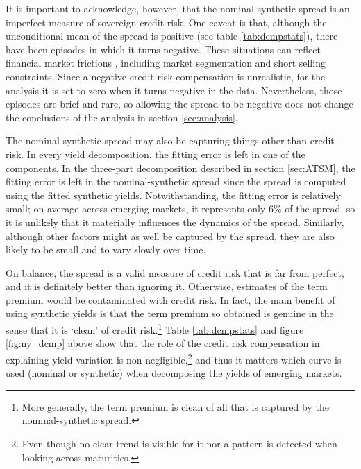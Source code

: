 {It is important to acknowledge, however, that the nominal-synthetic spread is an imperfect measure of sovereign credit risk. 
One caveat is that, although the unconditional mean of the spread is positive (see table \ref{tab:dcmpstats}), there have been episodes in which it turns negative. 
These situations can reflect financial market frictions \citep{DuSchreger:2016JoF}, including market segmentation and short selling constraints. 
Since a negative credit risk compensation is unrealistic, for the analysis it is set to zero when it turns negative in the data. 
Nevertheless, those episodes are brief and rare, so allowing the spread to be negative does not change the conclusions of the analysis in section \ref{sec:analysis}. 

The nominal-synthetic spread may also be capturing things other than credit risk. 
In every yield decomposition, the fitting error is left in one of the components. In the three-part decomposition described in section \ref{sec:ATSM}, the fitting error is left in the nominal-synthetic spread since the spread is computed using the fitted synthetic yields. 
Notwithstanding, the fitting error is relatively small; on average across emerging markets, it represents only 6\% of the spread, so it is unlikely that it materially influences the dynamics of the spread. 
Similarly, although other factors might as well be captured by the spread, they are also likely to be small and to vary slowly over time. 

On balance, the spread is a valid measure of credit risk that is far from perfect, and it is definitely better than ignoring it. 
Otherwise, estimates of the term premium would be contaminated with credit risk. 
In fact, the main benefit of using synthetic yields is that the term premium so obtained is genuine in the sense that it is `clean' of credit risk.\footnote{More generally, the term premium is clean of all that is captured by the nominal-synthetic spread.} 
Table \ref{tab:dcmpstats} and figure \ref{fig:ny_dcmp} above show that the role of the credit risk compensation in explaining yield variation is non-negligible,\footnote{Even though no clear trend is visible for it nor a pattern is detected when looking across maturities.} and thus it matters which curve is used (nominal or synthetic) when decomposing the yields of emerging markets. 

}
